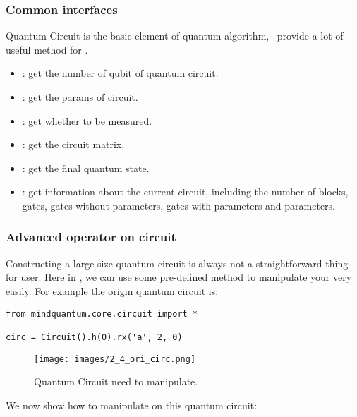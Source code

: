 \subsubsection{Common interfaces}

Quantum Circuit is the basic element of quantum algorithm, \MindQuantum\ provide a lot of useful method for \Circuit.

\begin{itemize}
    \item \propnqubits: get the number of qubit of quantum circuit.
    \item \propparamsname: get the params of circuit.
    \item \prophasmeasuregate: get whether to be measured.
    \item \methodmatrix: get the circuit matrix.
    \item \methodgetqs: get the final quantum state.
    \item \methodsummary: get information about the current circuit, including the number of blocks, gates, gates without parameters, gates with parameters and parameters.
\end{itemize}

\subsubsection{Advanced operator on circuit}

Constructing a large size quantum circuit is always not a straightforward thing for user. Here in \MindQuantum, we can use some pre-defined method to manipulate your \Circuit very easily. For example the origin quantum circuit is:

\begin{lstlisting}
from mindquantum.core.circuit import *

circ = Circuit().h(0).rx('a', 2, 0)
\end{lstlisting}

\begin{figure}[H]
    \begin{center}
        \texttt{[image: images/2\_4\_ori\_circ.png]}
    \end{center}
    \caption{Quantum Circuit need to manipulate.}
\end{figure}
We now show how to manipulate on this quantum circuit:


